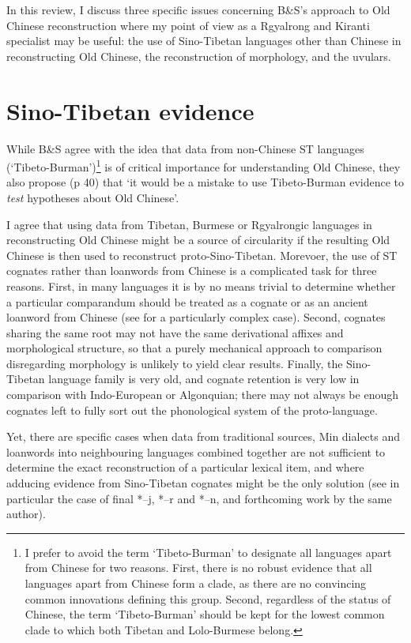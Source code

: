 \documentclass[oldfontcommands,oneside,a4paper,11pt]{article}
\newcommand{\ipa}[1]{{\phon #1}} %
\begin{document}

In this review, I discuss three specific issues concerning B\&S's approach to Old Chinese reconstruction where my point of view as a Rgyalrong and Kiranti specialist may be useful: the use of Sino-Tibetan languages other than Chinese in reconstructing Old Chinese, the reconstruction of morphology, and the uvulars.

\section{Sino-Tibetan evidence}
While B\&S agree with the idea that data from non-Chinese ST languages (`Tibeto-Burman')\footnote{I prefer to avoid the term `Tibeto-Burman' to designate all languages apart from Chinese for two reasons. First, there is no robust evidence that all languages apart from Chinese form a clade, as there are no convincing common innovations defining this group. Second, regardless of the status of Chinese, the term `Tibeto-Burman' should be kept for the lowest common clade to which both Tibetan and Lolo-Burmese belong. } is of critical importance for understanding Old Chinese, they also propose (p 40) that `it would be a mistake to use Tibeto-Burman evidence to \textit{test} hypotheses about Old Chinese'.

 I agree that using data from Tibetan, Burmese or Rgyalrongic languages in reconstructing Old Chinese might be a source of circularity if the resulting Old Chinese is then used to reconstruct proto-Sino-Tibetan. Morevoer, the use of ST cognates rather than loanwords from Chinese is a complicated task for three reasons. First, in many languages it is by no means trivial to determine whether a particular comparandum should be treated as a cognate or as an ancient loanword from Chinese (see \citealt{sagart08bai} for a particularly complex case). Second, cognates sharing the same root may not have the same derivational affixes and morphological structure, so that a purely mechanical approach to comparison disregarding morphology is unlikely to yield clear results. Finally, the Sino-Tibetan language family is very old, and cognate retention is very low in comparison with Indo-European or Algonquian; there may not always be enough cognates left to fully sort out the phonological system of the proto-language.
 
 Yet, there are specific cases when data from traditional sources, Min dialects and loanwords into neighbouring languages combined together are  not sufficient to determine the exact reconstruction of a particular lexical item, and where adducing evidence from Sino-Tibetan cognates might be the only solution (see in particular the case of final *\ipa{--j}, *\ipa{--r} and *\ipa{--n}, \citealt{hill14jrn} and forthcoming work by the same author).
\end{document}
